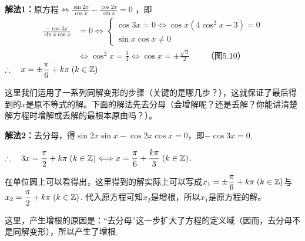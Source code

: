 \begin{solution}
\textbf{解法1：}原方程$\Longleftrightarrow \frac{\sin2x}{\cos x}-\frac{\cos 2x}{\sin x}=0$
，即
\[\begin{split}
\frac{-\cos 3x}{\sin x\cos x}&=0\Longleftrightarrow \begin{cases}
    \cos3x=0 \Leftrightarrow \cos x(4\cos^2 x-3)=0\\
    \sin x\cos x\ne 0   
\end{cases} 
\\
&\Longleftrightarrow \cos^2 x=\frac{3}{4}\Longleftrightarrow \cos x=\pm\frac{\sqrt{3}}{2} \qquad \text{（图5.10）}
\end{split} \]
$\therefore\quad x=\pm\dfrac{\pi}{6}+k\pi\; (k\in\mathbb{Z})$

\noindent
\begin{minipage}{.45\textwidth}
    \centering
{}
\end{minipage}
\hfill
\begin{minipage}{.45\textwidth}
\begin{remark}
这里我们运用了一系列同解变形的步骤（关键的是哪几步？），这就保证了最后得到的$x$是原不等式的解。下面的解法先去分母（会增解呢？还是丢解？你能讲清楚解方程时增解或丢解的最根本原由吗？）。
\end{remark}
\end{minipage}

\textbf{解法2：}去分母，得$\sin2x\sin x-\cos2x\cos x=0$，即$-\cos3x=0$,

$\therefore\quad 3x=\dfrac{\pi}{2}+k\pi\; (k\in\mathbb{Z})\Longleftrightarrow x=\dfrac{\pi}{6}+\dfrac{k\pi}{3}\; (k\in\mathbb{Z})$.

在单位圆上可以看得出，这里得到的解实际上可以写成$x_1=\pm\dfrac{\pi}{6}+k\pi\; (k\in\mathbb{Z} )$与$x_2=\dfrac{\pi}{2}+k\pi\; (k\in\mathbb{Z} )$. 代入原方程可知$x_2$是增根，所以$x_1$是原方程的解。

\begin{remark}
    这里，产生增根的原因是：“去分母”这一步扩大了方程的定义域（因而，去分母不是同解变形），所以产生了增根.
\end{remark}
\end{solution}

